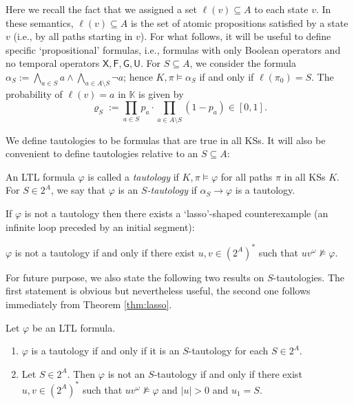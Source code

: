 \documentclass[runngingheads]{llncs}
\begin{document}
Here we recall the fact that we assigned a set $\ell(v) \subseteq A$ to each state $v$. In these semantics, $\ell(v) \subseteq A$ is the set of atomic propositions satisfied by a state $v$ (i.e., by all paths starting in $v$). For what follows, it will be useful to define specific `propositional' formulas, i.e., formulas with only Boolean operators and no temporal operators $\mathsf{X},\mathsf{F},\mathsf{G},\mathsf{U}$. For $S \subseteq A$, we consider the formula $\alpha_S := \bigwedge_{a \in S} a \wedge \bigwedge_{a \in A \setminus S} \neg a$; hence $K,\pi \models \alpha_S$ if and only if $\ell(\pi_0) = S$. The probability of $\ell(v) = a$ in $\mathbb{K}$ is given by
\begin{equation}
\varrho_S := \prod_{a \in S} p_a \cdot \prod_{a \in A \setminus S} (1-p_a) \in [0,1]. \label{eq:rho}
\end{equation}

We define tautologies to be formulas that are true in all KSs. It will also be convenient to define tautologies relative to an $S \subseteq A$:

\begin{definition}
An LTL formula $\varphi$ is called a \emph{tautology} if $K,\pi \models \varphi$ for all paths $\pi$ in all KSs $K$. For $S \in 2^A$, we say that $\varphi$ is an \emph{$S$-tautology} if $\alpha_S \rightarrow \varphi$ is a tautology.
\end{definition}

If $\varphi$ is not a tautology then there exists a `lasso'-shaped counterexample (an infinite loop preceded by an initial segment):

\begin{theorem} \label{thm:lasso}
\emph{\cite{vardi1986automata}} $\varphi$ is not a tautology if and only if there exist $u,v \in (2^{A})^*$ such that $uv^{\omega} \not \models \varphi$.
\end{theorem}

For future purpose, we also state the following two results on $S$-tautologies. The first statement is obvious but nevertheless useful, the second one follows immediately from Theorem \ref{thm:lasso}.

\begin{corollary} \label{cor:counterword}
Let $\varphi$ be an LTL formula.
\begin{enumerate}
\item $\varphi$ is a tautology if and only if it is an $S$-tautology for each $S \in 2^A$.
\item Let $S \in 2^A$. Then $\varphi$ is not an $S$-tautology if and only if there exist $u,v \in (2^A)^*$ such that $uv^{\omega} \not \models \varphi$ and $|u| > 0$ and $u_1 = S$.
\end{enumerate}
\end{corollary}
\end{document}
